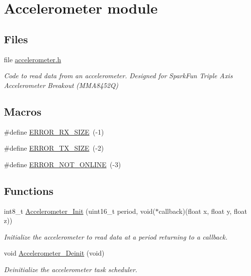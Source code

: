 \hypertarget{group__accelerometer}{}\section{Accelerometer module}
\label{group__accelerometer}
\subsection*{Files}
\begin{DoxyCompactItemize}
\item 
file \mbox{\hyperlink{accelerometer_8h}{accelerometer.\+h}}
\begin{DoxyCompactList}\small\item\em Code to read data from an accelerometer. Designed for Spark\+Fun Triple Axis Accelerometer Breakout (M\+M\+A8452Q) \end{DoxyCompactList}\end{DoxyCompactItemize}
\subsection*{Macros}
\begin{DoxyCompactItemize}
\item 
\#define \mbox{\hyperlink{group__accelerometer_ga8b423e9f25b16e32c82ab15528d61d1b}{E\+R\+R\+O\+R\+\_\+\+R\+X\+\_\+\+S\+I\+ZE}}~(-\/1)
\item 
\#define \mbox{\hyperlink{group__accelerometer_ga5f5adccae1b5f6db5c660ae10cec9afb}{E\+R\+R\+O\+R\+\_\+\+T\+X\+\_\+\+S\+I\+ZE}}~(-\/2)
\item 
\#define \mbox{\hyperlink{group__accelerometer_ga802fe27b06ba320251ae97983a68ce64}{E\+R\+R\+O\+R\+\_\+\+N\+O\+T\+\_\+\+O\+N\+L\+I\+NE}}~(-\/3)
\end{DoxyCompactItemize}
\subsection*{Functions}
\begin{DoxyCompactItemize}
\item 
int8\+\_\+t \mbox{\hyperlink{group__accelerometer_gabb5dc31f52b4c94babb890afe85fdc29}{Accelerometer\+\_\+\+Init}} (uint16\+\_\+t period, void($\ast$callback)(float x, float y, float z))
\begin{DoxyCompactList}\small\item\em Initialize the accelerometer to read data at a period returning to a callback. \end{DoxyCompactList}\item 
void \mbox{\hyperlink{group__accelerometer_gae22be8908e6faff9d8ea3e54adfb31f0}{Accelerometer\+\_\+\+Deinit}} (void)
\begin{DoxyCompactList}\small\item\em Deinitialize the accelerometer task scheduler. \end{DoxyCompactList}\end{DoxyCompactItemize}


